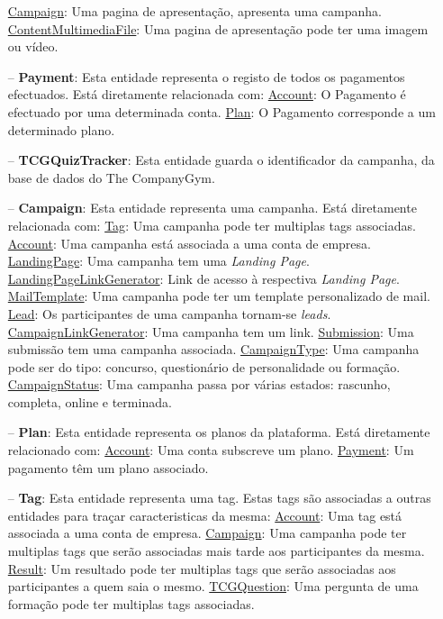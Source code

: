 \begin{itemize}
		\subitem \underline{Campaign}: Uma pagina de apresentação, apresenta uma campanha.
		\subitem \underline{ContentMultimediaFile}: Uma pagina de apresentação pode ter uma imagem ou vídeo.
	\item[--] \textbf{Payment}: Esta entidade representa o registo de todos os pagamentos efectuados. Está diretamente relacionada com:
		\subitem \underline{Account}: O Pagamento é efectuado por uma determinada conta.
		\subitem \underline{Plan}: O Pagamento corresponde a um determinado plano.
	\item[--] \textbf{TCGQuizTracker}: Esta entidade guarda o identificador da campanha, da base de dados do The CompanyGym.
	\item[--] \textbf{Campaign}: Esta entidade representa uma campanha.  Está diretamente relacionada com:
		\subitem \underline{Tag}: Uma campanha pode ter multiplas tags associadas.
		\subitem \underline{Account}: Uma campanha está associada a uma conta de empresa.
		\subitem \underline{LandingPage}: Uma campanha tem uma \textit{Landing Page}.
		\subitem \underline{LandingPageLinkGenerator}: Link de acesso à respectiva \textit{Landing Page}. 
		\subitem \underline{MailTemplate}: Uma campanha pode ter um template personalizado de mail.
		\subitem \underline{Lead}: Os participantes de uma campanha tornam-se \textit{leads}.
		\subitem \underline{CampaignLinkGenerator}: Uma campanha tem um link.
		\subitem \underline{Submission}: Uma submissão tem uma campanha associada.
		\subitem \underline{CampaignType}: Uma campanha pode ser do tipo: concurso, questionário de personalidade ou formação.
		\subitem \underline{CampaignStatus}: Uma campanha passa por várias estados: rascunho, completa, online e terminada.
	\item[--] \textbf{Plan}: Esta entidade representa os planos da plataforma. Está diretamente relacionado com:
		\subitem \underline{Account}: Uma conta subscreve um plano.
		\subitem \underline{Payment}: Um pagamento têm um plano associado.
	\item[--] \textbf{Tag}: Esta entidade representa uma tag. Estas tags são associadas a outras entidades para traçar caracteristicas da mesma:
		\subitem \underline{Account}: Uma tag está associada a uma conta de empresa.
		\subitem \underline{Campaign}: Uma campanha pode ter multiplas tags que serão associadas mais tarde aos participantes da mesma.
		\subitem \underline{Result}: Um resultado pode ter multiplas tags que serão associadas aos participantes a quem saia o mesmo.
		\subitem \underline{TCGQuestion}: Uma pergunta de uma formação pode ter multiplas tags associadas.

\end{itemize}
